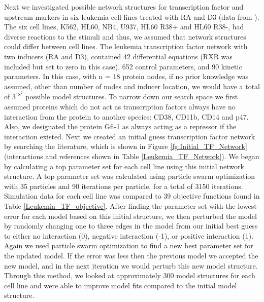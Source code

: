 \documentclass[12pt]{article}
\begin{document}
Next we investigated possible network structures for transcription factor and upstream markers in six leukemia cell lines treated with RA and D3 (data from \cite{Jensen2015}).
The six cell lines, K562, HL60, NB4, U937, HL60 R38+ and HL60 R38-, had diverse reactions to the stimuli and thus, we assumed that network structures could differ between cell lines.
The leukemia transcription factor network with two inducers (RA and D3), contained 42 differential equations (RXR was included but set to zero in this case), 652 control parameters, and 90 kinetic parameters. 
In this case, with n = 18 protein nodes, if no prior knowledge was assumed, other than number of nodes and inducer location, we would have a total of $3^{18^{2}}$ possible model structures. 
To narrow down our search space we first assumed proteins which do not act as transcription factors always have no interaction from the protein to another species: CD38, CD11b, CD14 and p47. 
Also, we designated the protein Gfi-1 as always acting as a repressor if the interaction existed.
Next we created an initial guess transcription factor network by searching the literature, which is shown in Figure \ref{fg:Initial_TF_Network} (interactions and references shown in Table \ref{Leukemia_TF_Network}).
We began by calculating a top parameter set for each cell line using this initial network structure. 
A top parameter set was calculated using particle swarm optimization with 35 particles and 90 iterations per particle, for a total of 3150 iterations. 
Simulation data for each cell line was compared to 39 objective functions found in Table \ref{Leukemia_TF_objective}.
After finding the parameter set with the lowest error for each model based on this initial structure, we then perturbed the model by randomly changing one to three edges in the model from our initial best guess to either no interaction (0), negative interaction (-1), or positive interaction (1).
Again we used particle swarm optimization to find a new best parameter set for the updated model.
If the error was less then the previous model we accepted the new model, and in the next iteration we would perturb this new model structure. 
Through this method, we looked at approximately 300 model structures for each cell line and were able to improve model fits compared to the initial model structure.   
\end{document}

